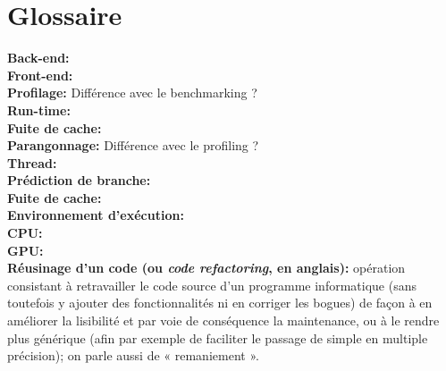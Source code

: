 \documentclass[10pt]{report}
\begin{document}
\renewcommand{\listfigurename}{Table des illustations}\listoffigures 
{}
\chapter*{Glossaire}
\noindent
\textbf{Back-end:}\\ 
\textbf{Front-end:}\\
\textbf{Profilage:} Différence avec le benchmarking ?\\
\textbf{Run-time:}\\
\textbf{Fuite de cache:}\\
\textbf{Parangonnage:} Différence avec le profiling ?\\
\textbf{Thread:}\\
\textbf{Prédiction de branche:}\\
\textbf{Fuite de cache:}\\
\textbf{Environnement d'exécution:}\\
\textbf{CPU:}\\
\textbf{GPU:}\\
\textbf{Réusinage d'un code (ou \textit{code refactoring}, en anglais):} opération consistant à retravailler le code source d'un programme informatique (sans toutefois y ajouter des fonctionnalités ni en corriger les bogues) de façon à en améliorer la lisibilité et par voie de conséquence la maintenance, ou à le rendre plus générique (afin par exemple de faciliter le passage de simple en multiple précision); on parle aussi de « remaniement ». 

\end{document}
